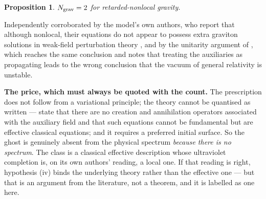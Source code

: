 \documentclass[11pt,letterpaper]{article}
\newtheorem{proposition}{Proposition}
\begin{document}
\begin{proposition}
$N_{\rm grav}=2$ for retarded-nonlocal gravity.
\end{proposition}
Independently corroborated by the model's own authors, who report that although nonlocal, their equations do not appear to possess extra graviton solutions in weak-field perturbation theory \cite{SoussaWoodard2003}, and by the unitarity argument of \cite{Foffa2014}, which reaches the same conclusion and notes that treating the auxiliaries as propagating leads to the wrong conclusion that the vacuum of general relativity is unstable.

\textbf{The price, which must always be quoted with the count.} The prescription does not follow from a variational principle; the theory cannot be quantised as written --- \cite{Foffa2014} state that there are no creation and annihilation operators associated with the auxiliary field and that such equations cannot be fundamental but are effective classical equations; and it requires a preferred initial surface. So the ghost is genuinely absent from the physical spectrum \emph{because there is no spectrum}. The class is a classical effective description whose ultraviolet completion is, on its own authors' reading, a local one. If that reading is right, hypothesis (iv) binds the underlying theory rather than the effective one --- but that is an argument from the literature, not a theorem, and it is labelled as one here.
\end{document}
